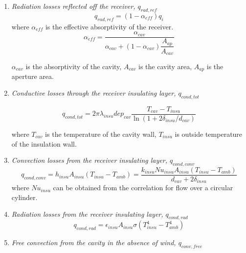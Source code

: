\begin{enumerate}[label=(\arabic*)]
  \item \emph{Radiation losses reflected off the receiver, $q_{rad,ref}$}
  \begin{equation}
    q_{rad,ref}=(1-\alpha_{eff})q_{i}
\end{equation}
    where $\alpha_{eff}$ is the effective absorptivity of the receiver.    
    \begin{equation}
    \alpha_{eff}=\frac{\alpha_{cav}}{\alpha_{cav}+(1-\alpha_{cav})\dfrac{A_{ap}}{A_{cav}}}
    \end{equation}
    
    $\alpha_{cav}$ is the absorptivity of the cavity, $A_{cav}$ is the cavity area, $A_{ap}$ is the aperture area.
  \item \emph{Conductive losses through the receiver insulating layer, $q_{cond,tot}$}
  
  \begin{equation}
q_{cond,tot}=2\pi\lambda_{insu}dep_{cav}\dfrac{T_{cav}-T_{insu}}{\ln(1 + 2\delta_{insu}/d_{cav})}
    \end{equation}
    
    where $T_{cav}$ is the temperature of the cavity wall, $T_{insu}$ is outside temperature of the insulation wall.

  \item \emph{Convection losses from the receiver insulating layer, $q_{cond,conv}$}  
  \begin{equation}
	q_{cond,conv}=h_{insu}A_{insu}(T_{insu}-T_{amb})
	=\dfrac{k_{insu}Nu_{insu}A_{insu}(T_{insu}-T_{amb})}{d_{cav}+2\delta_{insu}}
\end{equation}
where $Nu_{insu}$ can be obtained from the correlation for flow over a circular cylinder.~\cite{Churchill1977}

  \item \emph{Radiation losses from the receiver insulating layer, $q_{cond,rad}$}  
  \begin{equation}
	q_{cond,rad}=\epsilon_{insu}A_{insu}\sigma(T_{insu}^4 - T_{amb}^4)
\end{equation}
  \item \emph{Free convection from the cavity in the absence of wind, $q_{conv,free}$}
    

\end{enumerate}
